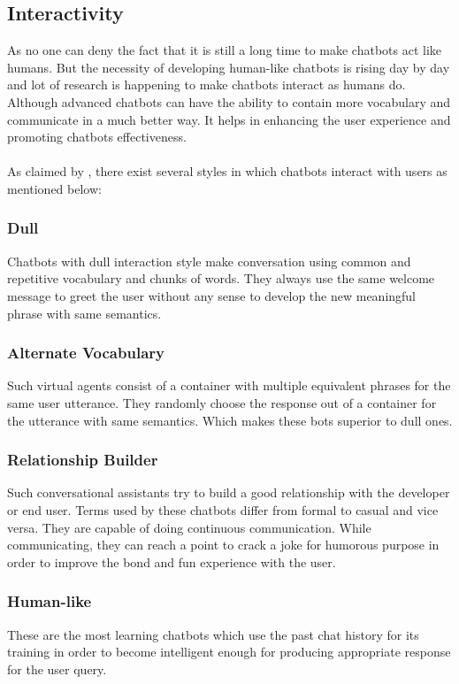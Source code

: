 \subsection{Interactivity}
As no one can deny the fact that it is still a long time to make chatbots act like humans. But the necessity of developing human-like chatbots is rising day by day and lot of research is happening to make chatbots interact as humans do. Although advanced chatbots can have the ability to contain more vocabulary and communicate in a much better way. It helps in enhancing the user experience and promoting chatbots effectiveness. \cite{frameworkforunderstandingchatbots}
\\~\\
As claimed by \cite{frameworkforunderstandingchatbots}, there exist several styles in which chatbots interact with users as mentioned below:

\subsubsection*{Dull}
Chatbots with dull interaction style make conversation using common and repetitive vocabulary and chunks of words. They always use the same welcome message to greet the user without any sense to develop the new meaningful phrase with same semantics. 

\subsubsection*{Alternate Vocabulary}
Such virtual agents consist of a container with multiple equivalent phrases for the same user utterance. They randomly choose the response out of a container for the utterance with same semantics. Which makes these bots superior to dull ones. 

\subsubsection*{Relationship Builder}
Such conversational assistants try to build a good relationship with the developer or end user. Terms used by these chatbots differ from formal to casual and vice versa. They are capable of doing continuous communication. While communicating, they can reach a point to crack a joke for humorous purpose in order to improve the bond and fun experience with the user. 

\subsubsection*{Human-like}
These are the most learning chatbots which use the past chat history for its training in order to become intelligent enough for producing appropriate response for the user query.  

